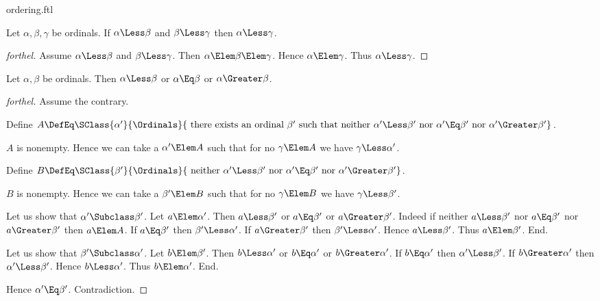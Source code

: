 \documentclass{stex}
\begin{document}
\begin{smodule}{ordering.ftl}
\begin{proposition*}[forthel]
  Let $\alpha, \beta, \gamma$ be ordinals.
  If $\alpha \Less \beta$ and $\beta \Less \gamma$ then $\alpha \Less \gamma$.
\end{proposition*}
\begin{proof}[forthel]
  Assume $\alpha \Less \beta$ and $\beta \Less \gamma$.
  Then $\alpha \Elem \beta \Elem \gamma$.
  Hence $\alpha \Elem \gamma$.
  Thus $\alpha \Less \gamma$.
\end{proof}

\begin{proposition*}[forthel]
  Let $\alpha, \beta$ be ordinals.
  Then $\alpha \Less \beta$ or $\alpha \Eq \beta$ or $\alpha \Greater \beta$.
\end{proposition*}
\begin{proof}[forthel]
  Assume the contrary.
  
  Define $A \DefEq \SClass{\alpha'}{\Ordinals}{\text{ there exists an ordinal }\beta'\text{ such that neither }\alpha' \Less \beta'\text{ nor }\alpha' \Eq \beta'\text{ nor }\alpha' \Greater \beta'}$.
  
  $A$ is nonempty.
  Hence we can take a $\alpha' \Elem A$ such that for no $\gamma \Elem A$ we have $\gamma \Less \alpha'$.
  
  Define $B \DefEq \SClass{\beta'}{\Ordinals}{\text{ neither }\alpha' \Less \beta'\text{ nor }\alpha' \Eq \beta'\text{ nor }\alpha' \Greater \beta'}$.
  
  $B$ is nonempty.
  Hence we can take a $\beta' \Elem B$ such that for no $\gamma \Elem B$ we have $\gamma \Less \beta'$.

  Let us show that $\alpha' \Subclass \beta'$.
    Let $a \Elem \alpha'$.
    Then $a \Less \beta'$ or $a \Eq \beta'$ or $a \Greater \beta'$.
    Indeed if neither $a \Less \beta'$ nor $a \Eq \beta'$ nor $a \Greater \beta'$ then
    $a \Elem A$.
    If $a \Eq \beta'$ then $\beta' \Less \alpha'$.
    If $a \Greater \beta'$ then $\beta' \Less \alpha'$.
    Hence $a \Less \beta'$.
    Thus $a \Elem \beta'$.
  End.

  Let us show that $\beta' \Subclass \alpha'$.
    Let $b \Elem \beta'$.
    Then $b \Less \alpha'$ or $b \Eq \alpha'$ or $b \Greater \alpha'$.
    If $b \Eq \alpha'$ then $\alpha' \Less \beta'$.
    If $b \Greater \alpha'$ then $\alpha' \Less \beta'$.
    Hence $b \Less \alpha'$.
    Thus $b \Elem \alpha'$.
  End.

  Hence $\alpha' \Eq \beta'$.
  Contradiction.
\end{proof}


\end{smodule}
\end{document}
